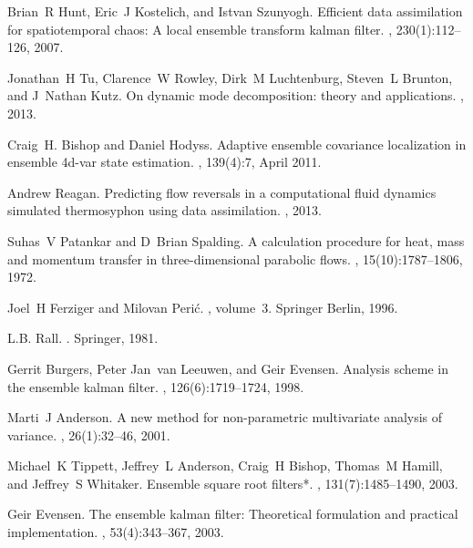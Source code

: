\documentclass[pre,twocolumn,twoside,byrevtex,superscriptaddress]{revtex4}
\begin{document}
\begin{thebibliography}{10}
Brian~R Hunt, Eric~J Kostelich, and Istvan Szunyogh.
\newblock Efficient data assimilation for spatiotemporal chaos: A local
  ensemble transform kalman filter.
, 230(1):112--126, 2007.

Jonathan~H Tu, Clarence~W Rowley, Dirk~M Luchtenburg, Steven~L Brunton, and
  J~Nathan Kutz.
\newblock On dynamic mode decomposition: theory and applications.
, 2013.

Craig~H. Bishop and Daniel Hodyss.
\newblock Adaptive ensemble covariance localization in ensemble 4d-var state
  estimation.
, 139(4):7, April 2011.

Andrew Reagan.
\newblock Predicting flow reversals in a computational fluid dynamics simulated
  thermosyphon using data assimilation.
, 2013.

Suhas~V Patankar and D~Brian Spalding.
\newblock A calculation procedure for heat, mass and momentum transfer in
  three-dimensional parabolic flows.
,
  15(10):1787--1806, 1972.

Joel~H Ferziger and Milovan Peri{\'c}.
, volume~3.
\newblock Springer Berlin, 1996.

L.B. Rall.
.
\newblock Springer, 1981.

Gerrit Burgers, Peter Jan~van Leeuwen, and Geir Evensen.
\newblock Analysis scheme in the ensemble kalman filter.
, 126(6):1719--1724, 1998.

Marti~J Anderson.
\newblock A new method for non-parametric multivariate analysis of variance.
, 26(1):32--46, 2001.

Michael~K Tippett, Jeffrey~L Anderson, Craig~H Bishop, Thomas~M Hamill, and
  Jeffrey~S Whitaker.
\newblock Ensemble square root filters*.
, 131(7):1485--1490, 2003.

Geir Evensen.
\newblock The ensemble kalman filter: Theoretical formulation and practical
  implementation.
, 53(4):343--367, 2003.

\end{thebibliography}
\end{document}
